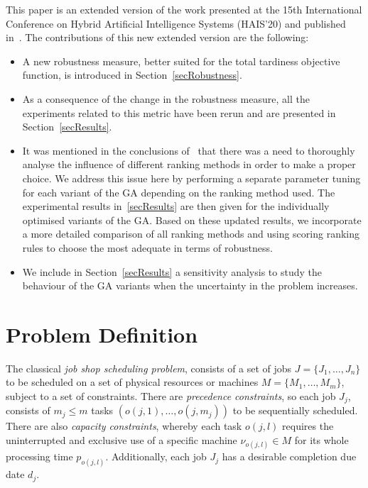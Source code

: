 \documentclass[12pt,halfline,a4paper]{ouparticle}
\begin{document}
This paper is an extended version of the work presented at the 15th International Conference on Hybrid Artificial Intelligence Systems (HAIS’20) and published in~\cite{Diaz2020}.  The contributions of this new extended version are the following:
\begin{itemize}
	\item A new robustness measure, better suited for the total tardiness objective function, is introduced in Section~\ref{secRobustness}.
	\item As a consequence of the change in the robustness measure, all the experiments related to this metric have been rerun and are presented in Section~\ref{secResults}.
	\item It was mentioned in the conclusions of~\cite{Diaz2020} that there was a need to thoroughly analyse the influence of different ranking methods in order to make a proper choice. We address this issue here by performing a separate parameter tuning for each variant of the GA depending on the ranking method used. The experimental results in~\ref{secResults} are then given for the individually optimised variants of the GA. Based on these updated results,  we incorporate a more detailed comparison of all ranking methods and using scoring ranking rules to choose the most adequate in terms of robustness.
	\item We include in Section~\ref{secResults} a sensitivity analysis to study the behaviour of the GA variants when the uncertainty in the problem increases.
\end{itemize}


\section{Problem Definition}\label{secIJSP}
The classical \emph{job shop scheduling problem}, consists of a set of jobs $J=\{J_1,\dots,J_n\}$ to be scheduled on a set of physical resources or machines $M=\{M_1, \dots, M_m\}$, subject to a set of constraints. There are \emph{precedence constraints}, so each job $J_j$, consists of $m_j \leq m$ tasks $(o(j,1),\dots,o(j,m_j))$ to be sequentially scheduled. There are also \emph{capacity constraints}, whereby each task $o(j,l)$ requires the uninterrupted and exclusive use of a specific machine $\nu_{o(j,l)} \in M$ for its whole processing time $p_{o(j,l)}$. Additionally, each job $J_j$ has a desirable completion due date $d_j$.
\end{document}
